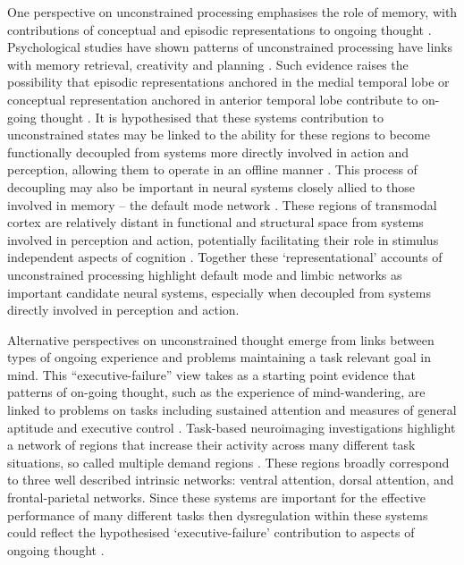 One perspective on unconstrained processing emphasises the role of memory, with contributions of conceptual and episodic representations to ongoing thought \cite{Binder2009,Gusnard2001}.
Psychological studies have shown patterns of unconstrained processing have links with memory retrieval, creativity and planning \cite{Baird2012,Leszczynski2017,Medea2016,Poerio2017}.
Such evidence raises the possibility that episodic representations anchored in the medial temporal lobe \cite{Moscovitch2016}
or conceptual representation anchored in anterior temporal lobe \cite{Lambon-Ralph2016}
contribute to on-going thought \cite{Smallwood2016}.
It is hypothesised that these systems contribution to unconstrained states may be linked to the ability for these regions to become functionally decoupled from systems more directly involved in action and perception, allowing them to operate in an offline manner \cite{SmallwoodCC2013}.
This process of decoupling may also be important in neural systems closely allied to those involved in memory – the default mode network \cite{Raichle2001}.
These regions of transmodal cortex are relatively distant in functional and structural space from systems involved in perception and action, potentially facilitating their role in stimulus independent aspects of cognition \cite{Buckner2013,Margulies2016,Mesulam1998}.
Together these `representational' accounts of unconstrained processing highlight default mode and limbic networks as important candidate neural systems, especially when decoupled from systems directly involved in perception and action.

Alternative perspectives on unconstrained thought emerge from links between types of ongoing experience and problems maintaining a task relevant goal in mind. This “executive-failure” view \cite{Kane2012,McVay2009}%
takes as a starting point evidence that patterns of on-going thought, such as the experience of mind-wandering, are linked to problems on tasks including sustained attention \cite{McVay2009}
and measures of general aptitude and executive control \cite{MrazekJoEP2012}.
Task-based neuroimaging investigations highlight a network of regions that increase their activity across many different task situations, so called multiple demand regions \cite{Duncan2010}. %
These regions broadly correspond to three well described intrinsic networks: ventral attention, dorsal attention, and frontal-parietal networks. Since these systems are important for the effective performance of many different tasks then dysregulation within these systems could reflect the hypothesised `executive-failure' contribution to aspects of ongoing thought \cite{McVay2009,Weissman2006}.%

